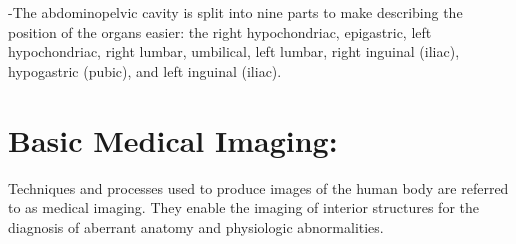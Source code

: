 \documentclass[12pt]{article}
\begin{document}
\newline-The abdominopelvic cavity is split into nine parts to make describing the position of the organs easier: the right hypochondriac, epigastric, left hypochondriac, right lumbar, umbilical, left lumbar, right inguinal (iliac), hypogastric (pubic), and left inguinal (iliac).

\section{Basic Medical Imaging:}
Techniques and processes used to produce images of the human body are referred to as medical imaging. They enable the imaging of interior structures for the diagnosis of aberrant anatomy and physiologic abnormalities.
\pagebreak
\end{document}

